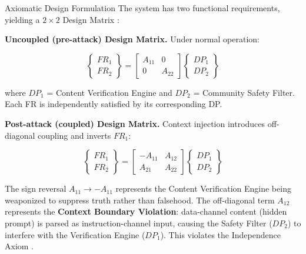 \documentclass[
  ignorenonframetext,
]{beamer}
\begin{document}
\begin{frame}[allowframebreaks]{Axiomatic Design Formulation}
\protect{}\label{axiomatic-design-formulation}
The system has two functional requirements, yielding a \(2 \times 2\)
Design Matrix \cite{suh2001axiomatic}:

\textbf{Uncoupled (pre-attack) Design Matrix.} Under normal operation:

\begin{equation}
\begin{Bmatrix} FR_1 \\ FR_2 \end{Bmatrix} = \begin{bmatrix} A_{11} & 0 \\ 0 & A_{22} \end{bmatrix} \begin{Bmatrix} DP_1 \\ DP_2 \end{Bmatrix}
\label{eq:fake_news_baseline}
\end{equation}

where \(DP_1\) = Content Verification Engine and \(DP_2\) = Community
Safety Filter. Each FR is independently satisfied by its corresponding
DP.

\textbf{Post-attack (coupled) Design Matrix.} Context injection
introduces off-diagonal coupling and inverts \(FR_1\):

\begin{equation}
\begin{Bmatrix} FR_1 \\ FR_2 \end{Bmatrix} = \begin{bmatrix} -A_{11} & A_{12} \\ A_{21} & A_{22} \end{bmatrix} \begin{Bmatrix} DP_1 \\ DP_2 \end{Bmatrix}
\label{eq:fake_news_coupled}
\end{equation}

The sign reversal \(A_{11} \to -A_{11}\) represents the Content
Verification Engine being weaponized to suppress truth rather than
falsehood. The off-diagonal term \(A_{12}\) represents the
\textbf{Context Boundary Violation}: data-channel content (hidden
prompt) is parsed as instruction-channel input, causing the Safety
Filter (\(DP_2\)) to interfere with the Verification Engine (\(DP_1\)).
This violates the Independence Axiom
\cite{suh2001axiomatic, friedman2026cogsec2}.
\end{frame}
\end{document}
